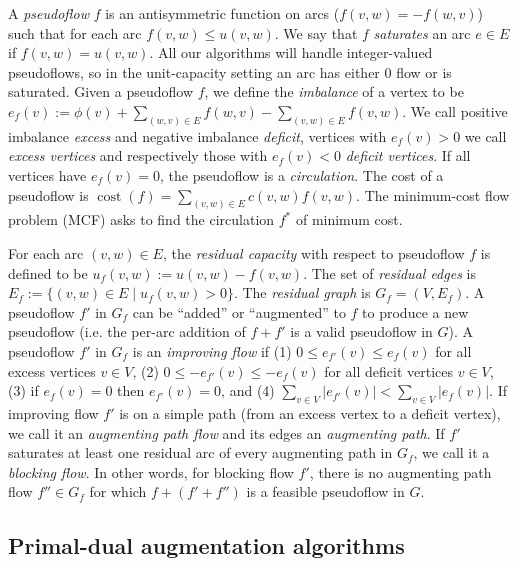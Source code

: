 \documentclass[11pt]{article}
\def\fsupply{\phi}
\theoremstyle{plain}
\def\cost{\operatorname{cost}}
\begin{document}
A \emph{pseudoflow} $f$ is an antisymmetric function on arcs 
($f(v, w) = -f(w, v)$) such that for each arc $f(v, w) \leq u(v, w)$.
We say that $f$ \emph{saturates} an arc $e \in E$ if $f(v, w) = u(v, w)$.
All our algorithms will handle integer-valued pseudoflows, so in the 
unit-capacity setting an arc has either 0 flow or is saturated.
Given a pseudoflow $f$, we define the \emph{imbalance} of a vertex to be
$e_f(v) := \fsupply(v) + \sum_{(w, v) \in E}{f(w, v)} - \sum_{(v, w) \in E}{f(v, w)}$.
We call positive imbalance \emph{excess} and negative imbalance \emph{deficit},
vertices with $e_f(v) > 0$ we call \emph{excess vertices} and respectively 
those with $e_f(v) < 0$ \emph{deficit vertices}.
If all vertices have $e_f(v) = 0$, the pseudoflow is a \emph{circulation}.
The cost of a pseudoflow is $\cost(f) = \sum_{(v, w) \in E} c(v, w) f(v, w)$.
The minimum-cost flow problem (MCF) asks to find the circulation $f^*$ of 
minimum cost.

For each arc $(v, w) \in E$, the \emph{residual capacity} with respect to 
pseudoflow $f$ is defined to be $u_f(v, w) := u(v, w) - f(v, w)$.
The set of \emph{residual edges} is 
$E_f := \{(v, w) \in E \mid u_f(v, w) > 0\}$.
The \emph{residual graph} is $G_f = (V, E_f)$.
A pseudoflow $f'$ in $G_f$ can be ``added'' or ``augmented'' to $f$ to produce 
a new pseudoflow (i.e. the per-arc addition of $f + f'$ is a valid pseudoflow 
in $G$).
A pseudoflow $f'$ in $G_f$ is an \emph{improving flow} if (1) 
$0 \leq e_{f'}(v) \leq e_f(v)$ for all excess vertices $v \in V$,
(2) $0 \leq -e_{f'}(v) \leq -e_f(v)$ for all deficit vertices $v \in V$,
(3) if $e_f(v) = 0$ then $e_{f'}(v) = 0$, and (4) 
$\sum_{v \in V} |e_{f'}(v)| < \sum_{v \in V} |e_f(v)|$.
If improving flow $f'$ is on a simple path (from an excess vertex to a deficit 
vertex), we call it an \emph{augmenting path flow} and its edges an 
\emph{augmenting path}.
If $f'$ saturates at least one residual arc of every augmenting path in $G_f$,
we call it a \emph{blocking flow}.
In other words, for blocking flow $f'$, there is no augmenting path flow 
$f'' \in G_f$ for which $f + (f' + f'')$ is a feasible pseudoflow in $G$.

\subsection{Primal-dual augmentation algorithms}
\end{document}
